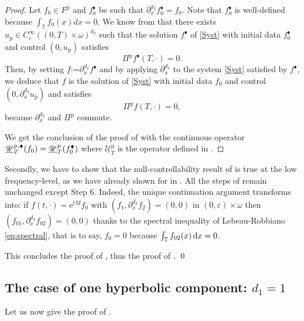 \documentclass[10pt]{amsart}
\let\mathcal\mathscr
\newcommand{\sblacklozenge}{{\scriptscriptstyle \blacklozenge}}
\theoremstyle{plain}
\theoremstyle{definition}
\theoremstyle{remark}
\newcommand{\diff}[1][-3]{\ensuremath{\mathop{}\mkern#1mu\mathrm{d}}}
\newcommand{\set}{\mathbb}
\newcommand{\T}{\set{T}}
\newcommand{\coloneqq}{\mathrel{\mathord{:}\mathord=}}
\newcommand{\p}{{\mathrm p}}
\newcommand{\eu}{\mathrm e}
\let\originalleft\left
\let\originalright\right
\renewcommand{\left}{\mathopen{}\mathclose\bgroup\originalleft}
\renewcommand{\right}{\aftergroup\egroup\originalright}
\begin{document}
\begin{proof}
Let $f_0 \in F^{\p}$ and $f_0^{\sblacklozenge}$ be such that $\partial_{x}^{d_2}f_0^{\sblacklozenge} = f_0$. Note that $f_0^{\sblacklozenge}$ is well-defined because $\int_{\T} f_0(x) dx = 0$. We know from  that there exists $u_{\p} \in C^\infty_c((0,T)\times\omega)^{d_2}$ such that the solution $f^{\sblacklozenge}$ of \eqref{Syst} with initial data $f_0^{\sblacklozenge}$ and control $(0,u_{\p})$ satisfies
\[
\Pi^{\p} f^{\sblacklozenge}(T,\cdot)=0.
\]
Then, by setting $f\coloneqq \partial_{x}^{d_2} f^{\sblacklozenge}$ and by applying $\partial_{x}^{d_2}$ to the system \eqref{Syst} satisfied by $f^{\sblacklozenge}$, we deduce that $f$ is the solution of \eqref{Syst} with initial data $f_0$ and control $(0, \partial_x^{d_2}u_{\p})$ and satisfies
\[
\Pi^{\p} f(T,\cdot)=0,
\]
because $\partial_{x}^{d_2}$ and $\Pi^{\p}$ commute.

We get the conclusion of the proof of  with the continuous operator $\underline{\mathcal{U}}_T^{\p,\sblacklozenge}(f_0) = \underline{\mathcal{U}}_T^\p\left(f_0^{\sblacklozenge}\right)$ where $\underline{\mathcal{U}}_T^\p$ is the operator defined in .
\end{proof}

Secondly, we have to show that the null-controllability result of  is true at the low frequency-level, as we have already shown for  in . All the steps of  remain unchanged except Step $6$. Indeed, the unique continuation argument transforms into: if $f(t,\cdot) = \eu^{tM} f_0$ with $(f_1, \partial_{x}^{d_2} f_2) = (0,0)$ in $(0,\varepsilon)\times\omega$ then $(f_{01}, \partial_{x}^{d_2} f_{02})= (0,0)$ thanks to the spectral inequality of Lebeau-Robbiano \eqref{eq:spectral}, that is to say, $f_0 = 0$ because $\int_{\T} f_{02}(x) \diff x =0$.

This concludes the proof of , thus the proof of . \qed

\subsection{The case of one hyperbolic component: $d_1 = 1$}
\label{SectionControlHyperbolicd_1=1}
Let us now give the proof of .
\end{document}
